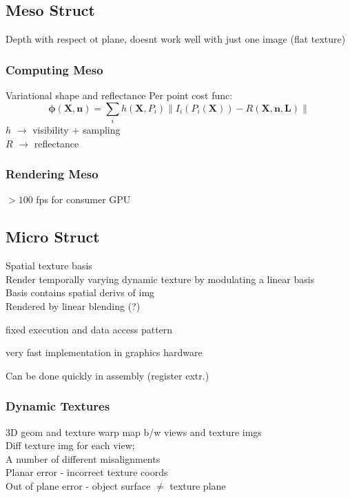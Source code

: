 \documentclass{article}
\begin{document}
\subsection{Meso Struct}
Depth with respect ot plane, doesnt work well with just one image (flat texture)
\subsubsection{Computing Meso}
Variational shape and reflectance
Per point cost func:
\[
  \mathbf{\phi (X,n)} = \sum_{i} h(\mathbf X, P_i)
  \|
  I_i (P_i(\mathbf X)) - R(\mathbf{X, n, L})
  \|
\]
$h$ $\to$ visibility + sampling
\\
$R$ $\to$ reflectance

\subsubsection{Rendering Meso}
$> 100$ fps for consumer GPU


\subsection{Micro Struct}
Spatial texture basis\\
Render temporally varying dynamic texture by modulating a linear basis
\\
Basis contains spatial derivs of img
\\
Rendered by linear blending (?)
\begin{list}{}{}
  \item fixed execution and data access pattern
  \item very fast implementation in graphics hardware
\end{list}
Can be done quickly in assembly (register extr.)

\subsubsection{Dynamic Textures}
3D geom and texture warp map b/w views and texture imgs
\\[5pt]
Diff texture img for each view;\\
A number of different misalignments 
\\[5pt]
Planar error - incorrect texture coords
\\
Out of plane error - object surface $\ne$ texture plane
\end{document}
